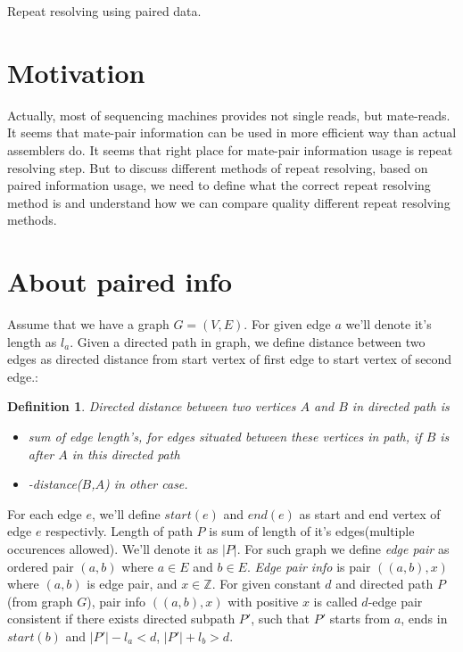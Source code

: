 \documentclass[12pt,a4paper,oneside]{article}
\newtheorem{definition}{Definition}
\begin{document}


\begin{center}
Repeat resolving using paired data.
\end{center}
\begin{abstract}
 In this paper we give a general definition for validness of repeat resolving methods based on paired information usage. We prove that rectangle graph technic is a honest repeat resolving method in case of error-free data and provide some ideas how to improve rectangle graph approach, and how can inexact mate-read gaps be overcame.
\end{abstract}

\section{Motivation}
Actually, most of sequencing machines provides not single reads, but mate-reads. It seems that mate-pair information can be used in more efficient way than actual assemblers do. It seems that right place for mate-pair information usage is repeat resolving step.
But to discuss different methods of repeat resolving, based on paired information usage, we need to define what the correct repeat resolving method is and understand how we can compare quality different repeat resolving methods. 

\section{About paired info}

Assume that we have a graph $G=(V,E)$. 
For given edge $a$ we'll denote it's length as $l_a$.
Given a directed path in graph, we define distance between two edges as directed distance from start vertex of first edge to start vertex of second edge.:
\begin{definition}
 Directed distance between two vertices $A$ and $B$ in directed path is 
\begin{itemize}
\item
  sum of edge length's, for edges situated between these vertices in path, if $B$ is after $A$ in this directed path
\item
  -distance($B$,$A$) in other case.
\end{itemize}
\end{definition}
For each edge $e$, we'll define $start(e)$ and $end(e)$ as start and end vertex of edge $e$ respectivly. Length of path $P$ is sum of length of it's edges(multiple occurences allowed). We'll denote it as $|P|$.
For such graph we define \emph{edge pair} as ordered pair $(a, b)$ where $a \in E$ and $b \in E$.
\emph{Edge pair info} is pair $((a,b), x)$ where $(a,b)$ is edge pair, and $x \in \mathbb{Z}$.
For given constant $d$ and directed path $P$ (from graph $G$), pair info $((a,b), x)$ with positive $x$ is called $d$-edge pair consistent  if there exists directed subpath $P'$, such that $P'$ starts from $a$, ends in $start(b)$ and $|P'| - l_a < d$, $|P'| + l_b > d$.  
\end{document}
